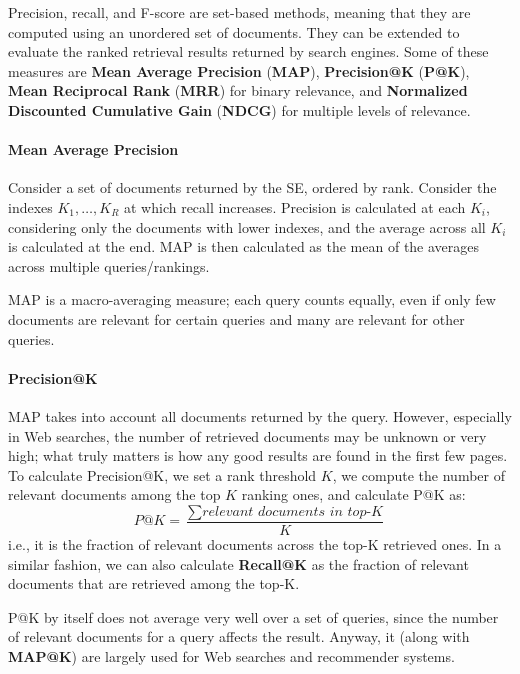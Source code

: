 Precision, recall, and F-score are set-based methods, meaning that they are computed using an unordered set of documents. They can be extended to evaluate the ranked retrieval results returned by search engines. Some of these measures are \textbf{Mean Average Precision} (\textbf{MAP}), \textbf{Precision@K} (\textbf{P@K}), \textbf{Mean Reciprocal Rank} (\textbf{MRR}) for binary relevance, and \textbf{Normalized Discounted Cumulative Gain} (\textbf{NDCG}) for multiple levels of relevance.

\paragraph{Mean Average Precision}

Consider a set of documents returned by the SE, ordered by rank. Consider the indexes $K_1, \dots, K_R$ at which recall increases. Precision is calculated at each $K_i$, considering only the documents with lower indexes, and the average across all $K_i$ is calculated at the end. MAP is then calculated as the mean of the averages across multiple queries/rankings.

MAP is a macro-averaging measure; each query counts equally, even if only few documents are relevant for certain queries and many are relevant for other queries.

\paragraph{Precision@K}

MAP takes into account all documents returned by the query. However, especially in Web searches, the number of retrieved documents may be unknown or very high; what truly matters is how any good results are found in the first few pages. To calculate Precision@K, we set a rank threshold $K$, we compute the number of relevant documents among the top $K$ ranking ones, and calculate P@K as:
\begin{equation*}
    P@K = \frac{\sum \textit{relevant documents in top-K}}{K}
\end{equation*}
i.e., it is the fraction of relevant documents across the top-K retrieved ones. In a similar fashion, we can also calculate \textbf{Recall@K} as the fraction of relevant documents that are retrieved among the top-K.

P@K by itself does not average very well over a set of queries, since the number of relevant documents for a query affects the result. Anyway, it (along with \textbf{MAP@K}) are largely used for Web searches and recommender systems.

